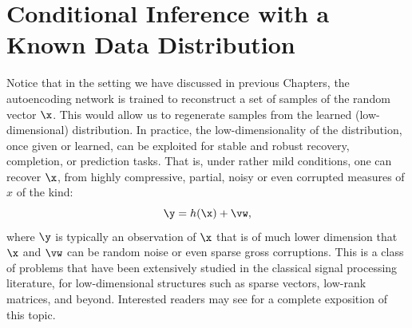 \documentclass[../../book-main.tex]{subfiles}
\begin{document}




\section{Conditional Inference with a Known Data Distribution}
Notice that in the setting we have discussed in previous Chapters, the
autoencoding network is trained to reconstruct a set of samples of the random vector $\x$. This would allow us to regenerate samples from  the learned (low-dimensional) distribution. In practice, the low-dimensionality of the distribution, once given or learned, can be exploited for stable and robust recovery, completion, or prediction tasks. That is, under rather mild conditions, one can recover $\x$, from highly compressive, partial, noisy or even corrupted measures of $x$ of the kind:
\begin{equation}
    \y = h(\x) + \vw,
\end{equation}
where $\y$ is typically an observation of $\x$ that is of much lower dimension that $\x$ and $\vw$ can be random noise or even sparse gross corruptions. This is a class of problems that have been extensively studied in the classical signal processing literature, for low-dimensional structures such as sparse vectors, low-rank matrices, and beyond. Interested readers may see \cite{Wright-Ma-2022} for a complete exposition of this topic.
\end{document}
